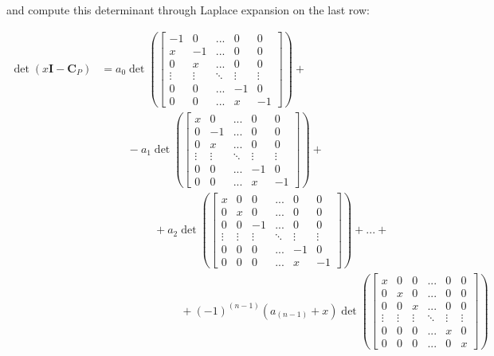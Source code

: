 	and compute this determinant through Laplace expansion on the last row:

\begin{align} \det\left(x \mathbf{I} - \mathbf{C}_P\right) &= a_0 \det\left(\left[\begin{array}{cccccc} -1 & 0 & ... & 0 & 0 \\[3mm] x & -1 & ... & 0 & 0 \\[3mm] 0 & x & ... & 0 & 0 \\[3mm] \vdots & \vdots & \ddots & \vdots & \vdots \\[3mm] 0 & 0 & ... & -1 & 0 \\[3mm] 0 & 0 & ... & x & -1 \end{array}\right]\right) + \nonumber  \\[3mm] 
%
& \hspace{1cm} - a_1 \det\left(\left[\begin{array}{cccccc} x & 0 & ... & 0 & 0 \\[3mm] 0 & -1 & ... & 0 & 0 \\[3mm] 0 & x & ... & 0 & 0 \\[3mm] \vdots & \vdots & \ddots & \vdots & \vdots \\[3mm] 0 & 0 & ... & -1 & 0 \\[3mm] 0 & 0 & ... & x & -1 \end{array}\right]\right) + \nonumber\\[5mm]
%
%
%
& \hspace{2cm} + a_2 \det\left(\left[\begin{array}{cccccc} x & 0 & 0 & ... & 0 & 0 \\[3mm] 0 & x & 0 &... & 0 & 0 \\[3mm] 0 & 0 & -1 & ... & 0 & 0 \\[3mm] \vdots & \vdots & \vdots & \ddots & \vdots & \vdots \\[3mm] 0 & 0 & 0 & ... & -1 & 0 \\[3mm] 0 & 0 & 0 & ... & x & -1 \end{array}\right]\right) + ... + \nonumber\\[5mm] 
%
& \hspace{3cm} + \left(-1\right)^{\left(n-1\right)}\left(a_{(n-1)} + x\right) \det\left(\left[\begin{array}{cccccc} x & 0 & 0 & ... & 0 & 0 \\[3mm] 0 & x & 0 &... & 0 & 0 \\[3mm] 0 & 0 & x & ... & 0 & 0 \\[3mm] \vdots & \vdots & \vdots & \ddots & \vdots & \vdots \\[3mm] 0 & 0 & 0 & ... & x & 0 \\[3mm] 0 & 0 & 0 & ... & 0 & x \end{array}\right]\right)
\end{align}

